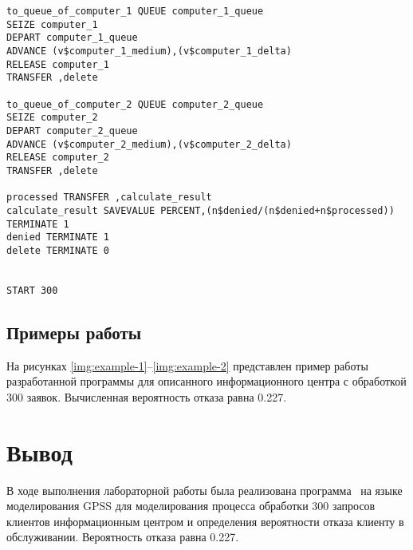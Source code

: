 \clearpage

\begin{center}
\captionsetup{justification=raggedright,singlelinecheck=off}
\begin{lstlisting}[label=lst:gpss-2,caption=Реализация программмы на языке GPSS, часть 2]
to_queue_of_computer_1 QUEUE computer_1_queue
SEIZE computer_1
DEPART computer_1_queue
ADVANCE (v$computer_1_medium),(v$computer_1_delta)
RELEASE computer_1
TRANSFER ,delete

to_queue_of_computer_2 QUEUE computer_2_queue
SEIZE computer_2
DEPART computer_2_queue
ADVANCE (v$computer_2_medium),(v$computer_2_delta)
RELEASE computer_2
TRANSFER ,delete

processed TRANSFER ,calculate_result
calculate_result SAVEVALUE PERCENT,(n$denied/(n$denied+n$processed))
TERMINATE 1
denied TERMINATE 1
delete TERMINATE 0


START 300
\end{lstlisting}
\end{center}

\subsection*{Примеры работы}

На рисунках \ref{img:example-1}--\ref{img:example-2} представлен пример работы разработанной программы для описанного информационного центра с обработкой 300 заявок. Вычисленная вероятность отказа равна 0.227.

\clearpage


\clearpage


\section*{Вывод}

В ходе выполнения лабораторной работы была реализована программа  на языке моделирования GPSS для моделирования процесса обработки 300 запросов клиентов информационным центром и определения вероятности отказа клиенту в обслуживании. Вероятность отказа равна  0.227.

